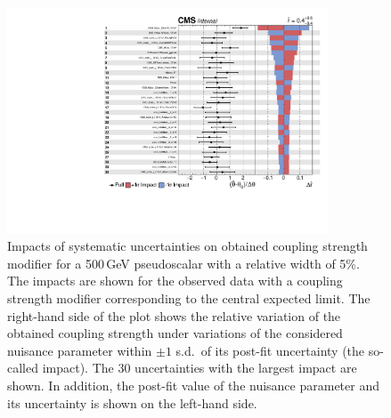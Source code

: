 \begin{figure}[!Hhtb]
\centering
\includegraphics[width=0.85\textwidth,keepaspectratio=true]{fig/app5/impacts/impacts_500_obs.pdf}
\caption{Impacts of systematic uncertainties on obtained coupling strength modifier for a 500\,GeV pseudoscalar with a relative width of 5\%. The impacts are shown for the observed data with a coupling strength modifier corresponding to the central expected limit. The right-hand side of the plot shows the relative variation of the obtained coupling strength under variations of the considered nuisance parameter within $\pm 1$ s.d.\ of its post-fit uncertainty (the so-called impact). The 30 uncertainties with the largest impact are shown. In addition, the post-fit value of the nuisance parameter and its uncertainty is shown on the left-hand side.}
\label{fig:impacts_obs_m500}
\end{figure}

